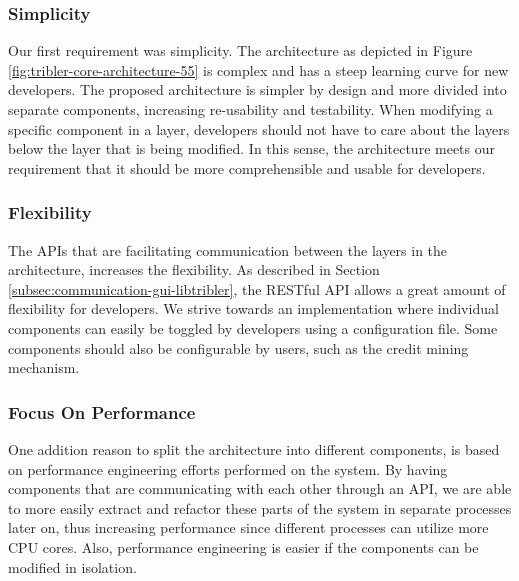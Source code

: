 \subsubsection{\textbf{Simplicity}}
Our first requirement was simplicity. The architecture as depicted in Figure \ref{fig:tribler-core-architecture-55} is complex and has a steep learning curve for new developers. The proposed architecture is simpler by design and more divided into separate components, increasing re-usability and testability. When modifying a specific component in a layer, developers should not have to care about the layers below the layer that is being modified. In this sense, the architecture meets our requirement that it should be more comprehensible and usable for developers.

\subsubsection{\textbf{Flexibility}}
The APIs that are facilitating communication between the layers in the architecture, increases the flexibility. As described in Section \ref{subsec:communication-gui-libtribler}, the RESTful API allows a great amount of flexibility for developers. We strive towards an implementation where individual components can easily be toggled by developers using a configuration file. Some components should also be configurable by users, such as the credit mining mechanism.

\subsubsection{\textbf{Focus On Performance}}
One addition reason to split the architecture into different components, is based on performance engineering efforts performed on the system. By having components that are communicating with each other through an API, we are able to more easily extract and refactor these parts of the system in separate processes later on, thus increasing performance since different processes can utilize more CPU cores. Also, performance engineering is easier if the components can be modified in isolation.